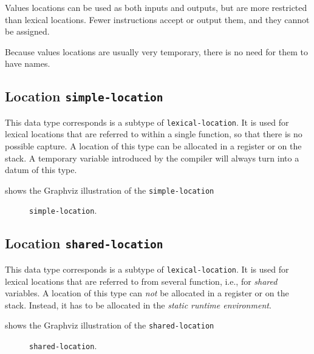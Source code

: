 Values locations can be used as both inputs and outputs, but are
more restricted than lexical locations. Fewer instructions accept or
output them, and they cannot be assigned.

Because values locations are usually very temporary, there is no
need for them to have names.


\subsection{Location \texttt{simple-location}}

This data type corresponds is a subtype of \texttt{lexical-location}.
It is used for lexical locations that are referred to within a single
function, so that there is no possible capture.  A location of this
type can be allocated in a register or on the stack.  A temporary
variable introduced by the compiler will always turn into a datum of
this type.

 shows the Graphviz illustration of the
\texttt{simple-location}

\begin{figure}
\begin{center}
\end{center}
\caption{\label{fig-simple-location}
\texttt{simple-location}.}
\end{figure}

\subsection{Location \texttt{shared-location}}

This data type corresponds is a subtype of \texttt{lexical-location}.
It is used for lexical locations that are referred to from several
function, i.e., for \emph{shared} variables.  A location of this
type can \emph{not} be allocated in a register or on the stack.
Instead, it has to be allocated in the \emph{static runtime
  environment}. 

 shows the Graphviz illustration of the
\texttt{shared-location}

\begin{figure}
\begin{center}
\end{center}
\caption{\label{fig-shared-location}
\texttt{shared-location}.}
\end{figure}

